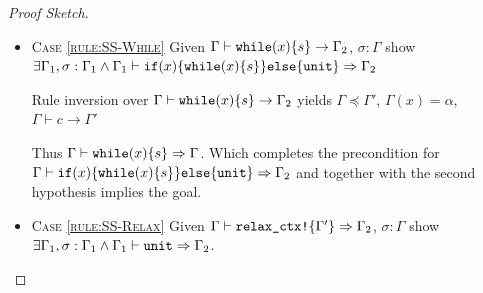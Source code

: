 \documentclass[twoside, english, final]{sdqthesis}
\newcommand{\set}[1]{\left\{ #1 \right\}}
\newcommand{\bbracket}[1]{\llbracket #1 \rrbracket}
\theoremstyle{definition}
\begin{document}
\begin{proof}[Proof Sketch]
\begin{itemize}
\begin{itemize}
        Choose $\Gamma_2 = \Gamma_1 = \Gamma[y \mapsto \gamma], \gamma \doteq \beta$.
        With $\Gamma \vdash \alpha \text{ fresh}$ using \cref{lem:conservatice-reference-typing} yields $\bbracket{\sigma(x)} = \&y$.
        \cref{lem:conf-sym-exec} yields $\sigma[y \mapsto \bbracket{\sigma(z)}] : \Gamma[y \mapsto \gamma], \gamma \doteq \beta$
      \item \textsc{Case \cref{rule:Assign-Weak}} gives:
        $\Gamma \vdash z: \tau$, $\Gamma \vdash *x \in \set{\bar{y_i}}$
        $\Gamma \vdash y_i : \set{\beta_i : b_i \mid \varphi_i }$
        $\Gamma \vdash \tau \preceq \set{\beta_j : b_j \mid \varphi_j}$ for $j \in [1, n]$.
        
         gives $\bbracket{\sigma(x)} = \&y_i$ for some $i \in [1, n]$.

        At this point it remains to be shown that the assigned type does not change conformance for the post state. We will show this in two steps: First we show that the assigned value preserves conformance, but for a different context. Then we will show that this context is a subcontext of $\Gamma$.

        Using \cref{lem:conf-sym-exec} we get $\sigma[y_j \mapsto \bbracket{z}\sigma] : \Gamma[y_j \mapsto \beta_j], (\alpha \simeq \bbracket{z}\Gamma)$ for all $j \in [1, n]$.

        By assumption $\Gamma \vdash \tau \preceq \set{\beta_j : b_j \mid \varphi_j}$ for every $j \in [1, n]$.
        Using \cref{lem:conservative-subtype} we get $\sigma[y_j \mapsto \bbracket{\sigma(z)}] : \Gamma$.
        For $\Gamma = \Gamma_1 = \Gamma_2$ the proof obligation is satisfied.
    \end{itemize}
    

  \item \textsc{Case \cref{rule:SS-While}}
    Given $\Gamma \vdash \code{while}(x) \{s\} \rightarrow \Gamma_2$, $\sigma : \Gamma$ 
    show $\exists \Gamma_1, \sigma : \Gamma_1 \wedge \Gamma_1 \vdash \code{if}(x) \{\code{while}(x) \{s\}\}\code{else}\{\code{unit}\} \Rightarrow \Gamma_2$

    Rule inversion over $\Gamma \vdash \code{while}(x) \{s\} \rightarrow \Gamma_2$ yields $\Gamma \preceq \Gamma'$, $\Gamma(x) = \alpha$, $\Gamma \vdash c \rightarrow \Gamma'$

    Thus $\Gamma \vdash \code{while}(x) \{s\} \Rightarrow \Gamma$.
    Which completes the precondition for \\$\Gamma \vdash \code{if}(x) \{\code{while}(x) \{s\}\}\code{else}\{\code{unit}\} \Rightarrow \Gamma_2$ and together with the second hypothesis implies the goal.
  \item \textsc{Case \cref{rule:SS-Relax}} 
    Given $\Gamma \vdash \code{relax\_ctx!}\{\Gamma'\} \Rightarrow \Gamma_2$, $\sigma : \Gamma$ 
    show $ \exists \Gamma_1, \sigma : \Gamma_1 \wedge \Gamma_1 \vdash \code{unit} \Rightarrow \Gamma_2$.


\end{itemize}
\end{proof}
\end{document}
